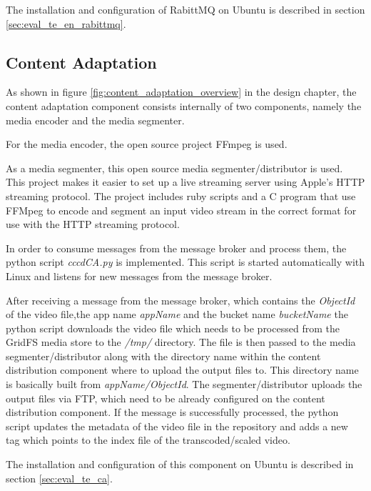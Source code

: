 The installation and configuration of RabittMQ on Ubuntu is described in section \ref{sec:eval_te_en_rabittmq}.

\subsection{Content Adaptation\label{sec:des_ar_ov}}
As shown in figure \ref{fig:content_adaptation_overview} in the design chapter, the content adaptation component consists internally of two components, namely the media encoder and the media segmenter. 

For the media encoder, the open source project FFmpeg is used. 

As a media segmenter, this open source media segmenter/distributor \cite{hlvssad} is used. This project makes it easier to set up a live streaming server using Apple's \ac{HTTP} streaming protocol. The project includes ruby scripts and a C program that use FFMpeg to encode and segment an input video stream in the correct format for use with the \ac{HTTP} streaming protocol.

In order to consume messages from the message broker and process them, the python script \textit{cccdCA.py} is implemented. This script is started automatically with Linux and listens for new messages from the message broker. %

After receiving a message from the message broker, which contains the \textit{ObjectId} of the video file,the app name \textit{appName} and the bucket name \textit{bucketName} the python script downloads the video file which needs to be processed from the GridFS media store to the \textit{/tmp/} directory. The file is then passed to the media segmenter/distributor along with the directory name within the content distribution component where to upload the output files to. This directory name is basically built from \textit{appName/ObjectId}. The segmenter/distributor uploads the output files via FTP, which need to be already configured on the content distribution component. If the message is successfully processed, the python script updates the metadata of the video file in the repository and adds a new tag which points to the index file of the transcoded/scaled video.

The installation and configuration of this component on Ubuntu is described in section \ref{sec:eval_te_ca}.
	

